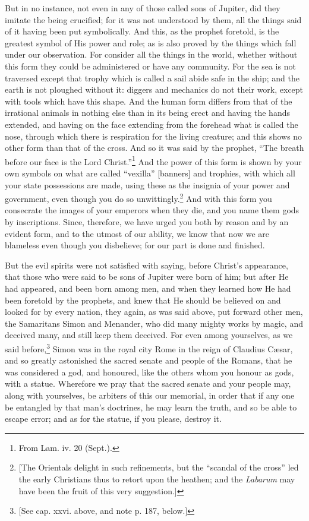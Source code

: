 
But in no instance, not even in any of those called sons of Jupiter, did they imitate the being crucified; for it was not understood by them, all the things said of it having been put symbolically. And this, as the prophet foretold, is the greatest symbol of His power and role; as is also proved by the things which fall under our observation. For consider all the things in the world, whether without this form they could be administered or have any community. For the sea is not traversed except that trophy which is called a sail abide safe in the ship; and the earth is not ploughed without it: diggers and mechanics do not their work, except with tools which have this shape. And the human form differs from that of the irrational animals in nothing else than in its being erect and having the hands extended, and having on the face extending from the forehead what is called the nose, through which there is respiration for the living creature; and this shows no other form than that of the cross. And so it was said by the prophet, “The breath before our face is the Lord Christ.”\footnote{From Lam. iv. 20 (Sept.).} And the power of this form is shown by your own symbols on what are called “vexilla” [banners] and  trophies, with which all your state possessions are made, using these as the insignia of your power and government, even though you do so unwittingly.\footnote{[The Orientals delight in such refinements, but the “scandal of the cross” led the early Christians thus to retort upon the heathen; and the \emph{Labarum} may have been the fruit of this very suggestion.]} And with this form you consecrate the images of your emperors when they die, and you name them gods by inscriptions. Since, therefore, we have urged you both by reason and by an evident form, and to the utmost of our ability, we know that now we are blameless even though you disbelieve; for our part is done and finished.


But the evil spirits were not satisfied with saying, before Christ’s appearance, that those who were said to be sons of Jupiter were born of him; but after He had appeared, and been born among men, and when they learned how He had been foretold by the prophets, and knew that He should be believed on and looked for by every nation, they again, as was said above, put forward other men, the Samaritans Simon and Menander, who did many mighty works by magic, and deceived many, and still keep them deceived. For even among yourselves, as we said before,\footnote{[See cap. xxvi. above, and note p. 187, below.]} Simon was in the royal city Rome in the reign of Claudius Cæsar, and so greatly astonished the sacred senate and people of the Romans, that he was considered a god, and honoured, like the others whom you honour as gods, with a statue. Wherefore we pray that the sacred senate and your people may, along with yourselves, be arbiters of this our memorial, in order that if any one be entangled by that man’s doctrines, he may learn the truth, and so be able to escape error; and as for the statue, if you please, destroy it.

